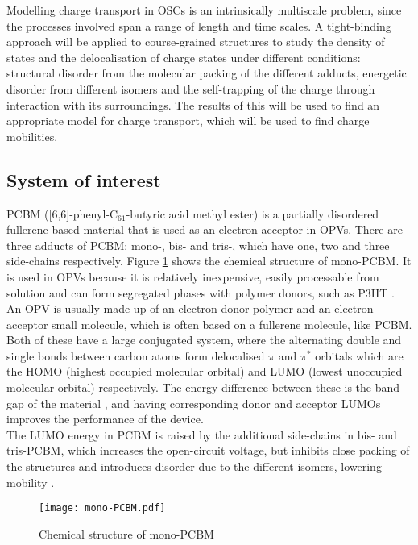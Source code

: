 \documentclass[a4paper,12pt]{article}
\begin{document}
\noindent Modelling charge transport in OSCs is an intrinsically multiscale problem, since the processes involved span a range of length and time scales. A tight-binding approach will be applied to course-grained structures to study the density of states and the delocalisation of charge states under different conditions: structural disorder from the molecular packing of the different adducts, energetic disorder from different isomers and the self-trapping of the charge through interaction with its surroundings. The results of this will be used to find an appropriate model for charge transport, which will be used to find charge mobilities.


\subsection{System of interest}

\noindent PCBM ([6,6]-phenyl-C$_{61}$-butyric acid methyl ester) is a partially disordered fullerene-based material that is used as an electron acceptor in OPVs. There are three adducts of PCBM: mono-, bis- and tris-, which have one, two and three side-chains respectively. Figure \ref{fig:PCBM} shows the chemical structure of mono-PCBM. It is used in OPVs because it is relatively inexpensive, easily processable from solution and can form segregated phases with polymer donors, such as P3HT \cite{Cheung2010}.\\ 

\noindent An OPV is usually made up of an electron donor polymer and an electron acceptor small molecule, which is often based on a fullerene molecule, like PCBM. Both of these have a large conjugated system, where the alternating double and single bonds between carbon atoms form delocalised $\pi$ and $\pi^*$ orbitals which are the HOMO (highest occupied molecular orbital) and LUMO (lowest unoccupied molecular orbital) respectively. The energy difference between these is the band gap of the material \cite{Bredas2004}, and having corresponding donor and acceptor LUMOs improves the performance of the device. \\ 

\noindent The LUMO energy in PCBM is raised by the additional side-chains in bis- and tris-PCBM, which increases the open-circuit voltage, but inhibits close packing of the structures and introduces disorder due to the different isomers, lowering mobility \cite{Lenes2009} \cite{Frost2010}.    

\begin{figure}[H]
\begin{center}
\texttt{[image: mono-PCBM.pdf]}
\end{center}
\caption{Chemical structure of mono-PCBM \cite{flopic}}
\label{fig:PCBM}
\end{figure}
\end{document}
